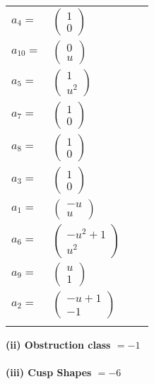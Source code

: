 \documentclass[1p]{elsarticle_modified}
\theoremstyle{definition}
\begin{document}
\begin{tabular}{m{7pt} m{180pt} m{7pt} m{180pt} }
\flushright $a_{4}=$&$\begin{pmatrix}1\\0\end{pmatrix}$ \\
\flushright $a_{10}=$&$\begin{pmatrix}0\\u\end{pmatrix}$ \\
\flushright $a_{5}=$&$\begin{pmatrix}1\\u^2\end{pmatrix}$ \\
\flushright $a_{7}=$&$\begin{pmatrix}1\\0\end{pmatrix}$ \\
\flushright $a_{8}=$&$\begin{pmatrix}1\\0\end{pmatrix}$ \\
\flushright $a_{3}=$&$\begin{pmatrix}1\\0\end{pmatrix}$ \\
\flushright $a_{1}=$&$\begin{pmatrix}- u\\u\end{pmatrix}$ \\
\flushright $a_{6}=$&$\begin{pmatrix}- u^2+1\\u^2\end{pmatrix}$ \\
\flushright $a_{9}=$&$\begin{pmatrix}u\\1\end{pmatrix}$ \\
\flushright $a_{2}=$&$\begin{pmatrix}- u+1\\-1\end{pmatrix}$\\&\end{tabular}
\flushleft \textbf{(ii) Obstruction class $= -1$}\\~\\
\flushleft \textbf{(iii) Cusp Shapes $= -6$}\\~\\
\end{document}

